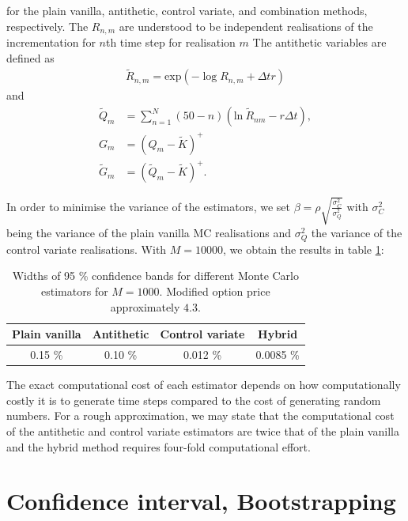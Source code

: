 \documentclass[a4paper,11pt]{article}
\newcommand{\expf}[1]{\mathrm{exp}\left ( {#1}\right )}
\newcommand{\parent}[1]{\left( {#1} \right)}
\newcommand{\ssum}[2]{\displaystyle\sum\limits_{#1}^{#2}}
\begin{document}
for the plain vanilla, antithetic, control variate, and combination methods, respectively. The
$R_{n,m}$ are understood to be independent realisations of the incrementation for $n$th time step
for realisation $m$ The antithetic variables
are defined as
\begin{align}
\tilde{R}_{n,m} = \expf{-\log{R_{n,m}+\Delta t r}}
\end{align}
and
\begin{align}
\tilde{Q}_m &= \ssum{n=1}{N} \parent{50-n} \parent{\mathrm{ln}~ \tilde{R}_{nm} - r \Delta t},
\\
G_m&=\parent{Q_m-\tilde K}^+
\\
\tilde G_m&=\parent{\tilde Q_m-\tilde K}^+.
\end{align}

In order to minimise the variance of the estimators, we set $\beta = \rho \sqrt{\frac{\sigma_C^2}{\sigma_Q^2}}$
with $\sigma_C^2$ being the variance of the plain vanilla MC realisations and $\sigma_Q^2$ the variance of
the control variate realisations. With $M=10000$, we obtain the results in table \ref{tb:MC}:
\begin{table}
\begin{center}
\begin{tabular}{c c cc }
  Plain vanilla & Antithetic & Control variate & Hybrid \\
  \hline
0.15 \% & 0.10 \% & 0.012 \% & 0.0085 \% 
\end{tabular}
\end{center}
\caption{\label{tb:MC}
Widths of 95 \% confidence bands for different Monte Carlo estimators for $M=1000$.
Modified option price approximately $4.3$.
}
\end{table}
The exact computational cost of each estimator depends on how computationally costly
it is to generate time steps compared to the cost of generating random numbers. For a
rough approximation, we may state that the computational cost of the antithetic and
control variate estimators are twice that of the plain vanilla and the hybrid method requires four-fold
computational effort.

\section*{Confidence interval, Bootstrapping}
\end{document}
